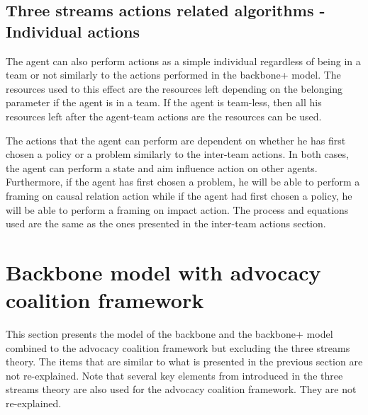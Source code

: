 %
%


\subsection{Three streams actions related algorithms - Individual actions}

The agent can also perform actions as a simple individual regardless of being in a team or not similarly to the actions performed in the backbone+ model. The resources used to this effect are the resources left depending on the belonging parameter if the agent is in a team. If the agent is team-less, then all his resources left after the agent-team actions are the resources can be used.

The actions that the agent can perform are dependent on whether he has first chosen a policy or a problem similarly to the inter-team actions. In both cases, the agent can perform a state and aim influence action on other agents. Furthermore, if the agent has first chosen a problem, he will be able to perform a framing on causal relation action while if the agent had first chosen a policy, he will be able to perform a framing on impact action. The process and equations used are the same as the ones presented in the inter-team actions section.


\section{Backbone model with advocacy coalition framework}

This section presents the model of the backbone and the backbone+ model combined to the advocacy coalition framework but excluding the three streams theory. The items that are similar to what is presented in the previous section are not re-explained. Note that several key elements from introduced in the three streams theory are also used for the advocacy coalition framework. They are not re-explained.

